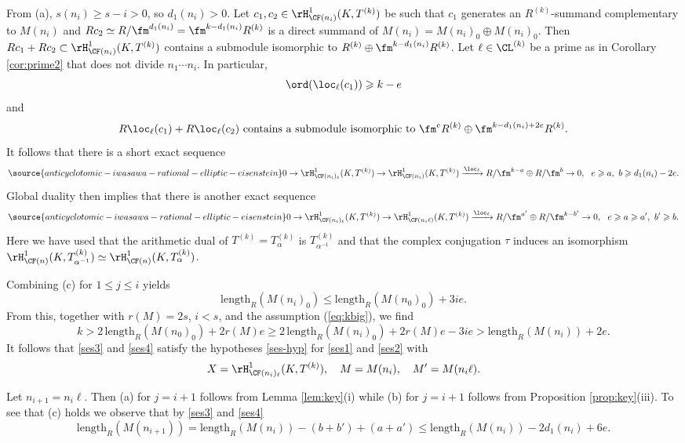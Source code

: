 From (a), $s(n_i) \geqslant s - i>0$, so $d_1(n_i)>0$.
Let $c_1, c_2 \in \rH^1_{\CF(n_i)}(K,T^{(k)})$ be such that $c_1$ generates an $R^{(k)}$-summand complementary
to $M(n_i)$  and
$R c_2 \simeq R/\fm^{d_1(n_i)} = \fm^{k-d_1(n_i)}R^{(k)}$ is a direct summand of
$M(n_i) = M(n_i)_0\oplus M(n_i)_0$. Then $Rc_1+R c_2\subset \rH^1_{\CF(n_i)}(K,T^{(k)})$ contains a submodule
isomorphic to $R^{(k)}\oplus \fm^{k-d_1(n_i)}R^{(k)}$.
Let $\ell \in \CL^{(k)}$ be a prime as in Corollary \ref{cor:prime2} that does not divide $n_1\cdots n_i$.
In particular,
$$
\ord(\loc_\ell(c_1)) \geqslant k-e
$$
and
$$
\text{$R\loc_\ell(c_1) + R\loc_\ell(c_2)$ contains a submodule isomorphic to
$\fm^{e}R^{(k)}\oplus \fm^{k-d_1(n_i)+2e}R^{(k)}$.}
$$
It follows that there is a short exact sequence
\begin{equation}\label{ses3}
\source{anticyclotomic-iwasawa-rational-elliptic-eisenstein}
0 \rightarrow \rH^1_{\CF(n_i)_\ell}(K,T^{(k)}) \rightarrow \rH^1_{\CF(n_i)}(K,T^{(k)}) \xrightarrow{\loc_\ell} R/\fm^{k-a} \oplus R/\fm^{b}
\rightarrow 0, \ \ e \geqslant a, \ b\geqslant d_1(n_i)-2e.
\end{equation}
Global duality then implies that there is another exact sequence
\begin{equation}\label{ses4}
\source{anticyclotomic-iwasawa-rational-elliptic-eisenstein}
0 \rightarrow \rH^1_{\CF(n_i)_\ell}(K,T^{(k)}) \rightarrow \rH^1_{\CF(n_i\ell)}(K,T^{(k)}) \xrightarrow{\loc_\ell} R/\fm^{a'} \oplus R/\fm^{k-b'}
\rightarrow 0, \ \ e\geqslant a\geqslant a', \ b'\geqslant b.
\end{equation}
Here we have used that the arithmetic dual of $T^{(k)} = T^{(k)}_\alpha$ is $T^{(k)}_{\alpha^{-1}}$ and that the complex conjugation $\tau$ induces an isomorphism $\rH^1_{\CF(n)}(K,T^{(k)}_{\alpha^{-1}})\simeq \rH^1_{\CF(n)}(K,T^{(k)}_{\alpha})$.

Combining (c) for $1\leqslant j \leqslant i$ yields
$$
\mathrm{length}_R(M(n_{i})_0) \leqslant \mathrm{length}_R(M(n_0)_0) + 3i e.
$$
From this, together with $r(M)=2s$, $i< s$, and the assumption (\ref{eq:kbig}), we find
$$
k> 2\,\mathrm{length}_R(M(n_0)_0) + 2r(M)e \geqslant 2\,\mathrm{length}_R(M(n_i)_0)+2r(M)e-3ie
> \mathrm{length}_R(M(n_i))+2e.
$$
It follows that \eqref{ses3} and \eqref{ses4} satisfy the hypotheses \eqref{ses-hyp} for \eqref{ses1} and \eqref{ses2}
with
\[
X =  \rH^1_{\CF(n_i)_\ell}(K,T^{(k)}),
\quad
M = M(n_i),\quad M' = M(n_i\ell).
\]

Let $n_{i+1}=n_i\ell$.  Then (a) for $j={i+1}$ follows from Lemma \ref{lem:key}(i)
while (b) for $j=i+1$ follows from Proposition \ref{prop:key}(iii).
To see that (c) holds we observe that by \eqref{ses3} and \eqref{ses4}
$$
\mathrm{length}_R(M(n_{i+1})) = \mathrm{length}_R(M(n_{i})) - (b+b') + (a+a')
\leqslant \mathrm{length}_R(M(n_{i})) - 2d_1(n_{i}) + 6e.
$$

